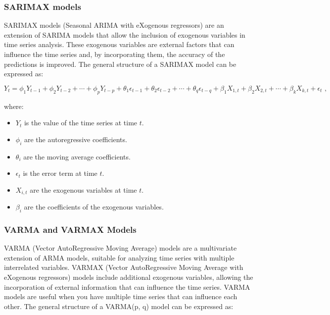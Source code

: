 \subsubsection{SARIMAX models}

SARIMAX models (Seasonal ARIMA with eXogenous regressors) are an extension of SARIMA models that allow the inclusion of exogenous variables in time series analysis. These exogenous variables are external factors that can influence the time series and, by incorporating them, the accuracy of the predictions is improved. The general structure of a SARIMAX model can be expressed as:

\begin{equation}
Y_t = \phi_1 Y_{t-1} + \phi_2 Y_{t-2} + \cdots + \phi_p Y_{t-p} + \theta_1 \epsilon_{t-1} + \theta_2 \epsilon_{t-2} + \cdots + \theta_q \epsilon_{t-q} + \beta_1 X_{1,t} + \beta_2 X_{2,t} + \cdots + \beta_k X_{k,t} + \epsilon_t \text{ ,}
\end{equation}

where:
\begin{itemize}
    \item \( Y_t \) is the value of the time series at time \( t \).
    \item \( \phi_i \) are the autoregressive coefficients.
    \item \( \theta_i \) are the moving average coefficients.
    \item \( \epsilon_t \) is the error term at time \( t \).
    \item \( X_{i,t} \) are the exogenous variables at time \( t \).
    \item \( \beta_i \) are the coefficients of the exogenous variables.
\end{itemize}
\vspace{10pt}

\subsubsection{VARMA and VARMAX Models}

VARMA (Vector AutoRegressive Moving Average) models are a multivariate extension of ARMA models, suitable for analyzing time series with multiple interrelated variables. VARMAX (Vector AutoRegressive Moving Average with eXogenous regressors) models include additional exogenous variables, allowing the incorporation of external information that can influence the time series. VARMA models are useful when you have multiple time series that can influence each other. The general structure of a VARMA(p, q) model can be expressed as:

